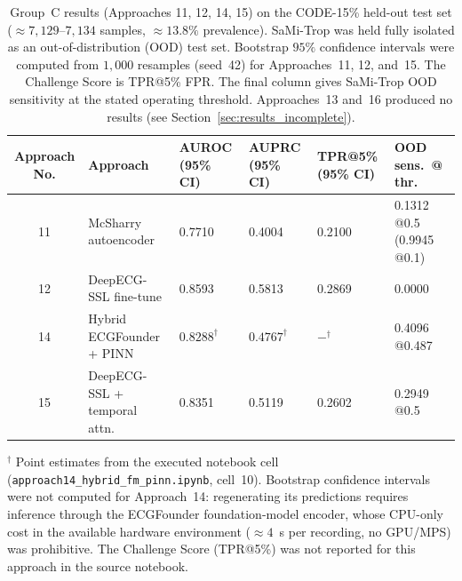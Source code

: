 \begin{table}[htbp]
\centering
\caption[Group C results for Approaches 11, 12, 14, 15]{Group~C results (Approaches 11, 12, 14, 15) on the CODE-15\% held-out
test set ($\approx 7{,}129$--$7{,}134$ samples, $\approx 13.8\%$ prevalence).
SaMi-Trop was held fully isolated as an out-of-distribution (OOD) test set.
Bootstrap $95\%$ confidence intervals were computed from $1{,}000$ resamples
(seed~42) for Approaches~11, 12, and~15. The Challenge Score is TPR@5\% FPR. The
final column gives SaMi-Trop OOD sensitivity at the stated operating threshold.
Approaches~13 and~16 produced no results (see Section~\ref{sec:results_incomplete}).}
\label{tab:groupC}
\footnotesize
\begin{tabular}{@{}c p{2.4cm} p{2.1cm} p{2.1cm} p{2.1cm} p{2.3cm}@{}}
\hline
\textbf{Approach No.} & \textbf{Approach} & \textbf{AUROC (95\% CI)} & \textbf{AUPRC (95\% CI)} & \textbf{TPR@5\% (95\% CI)} & \textbf{OOD sens.\ @ thr.} \\
\hline
11 & McSharry autoencoder         & 0.7710 \newline [0.7555--0.7873] & 0.4004 \newline [0.3711--0.4338] & 0.2100 \newline [0.1936--0.2308] & 0.1312 @0.5 \newline (0.9945 @0.1) \\
12 & DeepECG-SSL fine-tune        & 0.8593 \newline [0.8484--0.8716] & 0.5813 \newline [0.5462--0.6086] & 0.2869 \newline [0.2688--0.3049] & 0.0000 \\
14 & Hybrid ECGFounder + PINN     & $0.8288^{\dagger}$               & $0.4767^{\dagger}$               & $-^{\dagger}$                    & 0.4096 @0.487 \\
15 & DeepECG-SSL + temporal attn. & 0.8351 \newline [0.8240--0.8495] & 0.5119 \newline [0.4778--0.5458] & 0.2602 \newline [0.2418--0.2803] & 0.2949 @0.5 \\
\hline
\end{tabular}

\vspace{2pt}
{\footnotesize $^{\dagger}$ Point estimates from the executed notebook cell
(\texttt{approach14\_hybrid\_fm\_pinn.ipynb}, cell~10). Bootstrap confidence
intervals were not computed for Approach~14: regenerating its predictions
requires inference through the ECGFounder foundation-model encoder, whose
CPU-only cost in the available hardware environment ($\approx 4$~s per recording,
no GPU/MPS) was prohibitive. The Challenge Score (TPR@5\%) was not reported for
this approach in the source notebook.}
\end{table}

